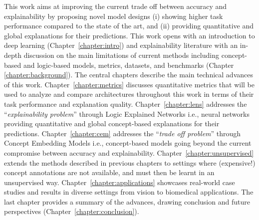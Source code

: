\documentclass[withindex,glossary]{cam-thesis}
\begin{document}
This work aims at improving the current trade off between accuracy and explainability by proposing novel model designs (i) showing higher task performance compared to the state of the art, and (ii) providing quantitative and global explanations for their predictions. This work opens with an introduction to deep learning (Chapter~\ref{chapter:intro}) and explainability literature with an in-depth discussion on the main limitations of current methods including concept-based and logic-based models, metrics, datasets, and benchmarks (Chapter \ref{chapter:background}). The central chapters describe the main technical advances of this work. Chapter~\ref{chapter:metrics} discusses quantitative metrics that will be used to analyze and compare architectures throughout this work in terms of their task performance and explanation quality. Chapter~\ref{chapter:lens} addresses the ``\textit{explainability problem}'' through Logic Explained Networks i.e., neural networks providing quantitative and global concept-based explanations for their predictions. Chapter~\ref{chapter:cem} addresses the ``\textit{trade off problem}'' through Concept Embedding Models i.e., concept-based models going beyond the current compromise between accuracy and explainability. Chapter~\ref{chapter:unsupervised} extends the methods described in previous chapters to settings where (expensive!) concept annotations are not available, and must then be learnt in an unsupervised way. Chapter~\ref{chapter:applications} showcases real-world case studies and results in diverse settings from vision to biomedical applications. The last chapter provides a summary of the advances, drawing conclusion and future perspectives (Chapter~\ref{chapter:conclusion}).

\bigskip
\end{document}
